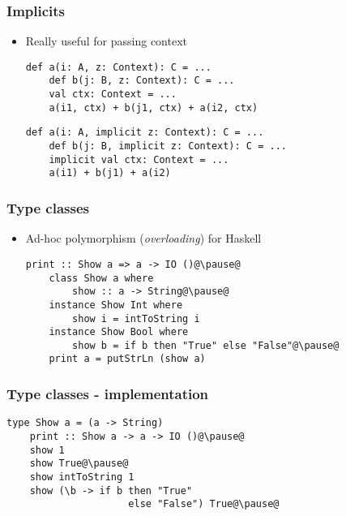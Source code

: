 \begin{frame}[fragile]
    \frametitle{Implicits}
    \begin{itemize}
        \item Really useful for passing context \\
        \begin{overprint}
        \begin{lstlisting}[mathescape]
    def a(i: A, z: Context): C = ...
    def b(j: B, z: Context): C = ...
    val ctx: Context = ...
    a(i1, ctx) + b(j1, ctx) + a(i2, ctx)
        \end{lstlisting}
        \begin{lstlisting}[mathescape]
    def a(i: A, implicit z: Context): C = ...
    def b(j: B, implicit z: Context): C = ...
    implicit val ctx: Context = ...
    a(i1) + b(j1) + a(i2)
        \end{lstlisting}
        \end{overprint}
    \end{itemize}
\end{frame}

\begin{frame}[fragile]
    \frametitle{Type classes}
    \begin{itemize}
        \pause
        \item Ad-hoc polymorphism (\emph{overloading}) for Haskell \\
        \pause
        \begin{lstlisting}[mathescape]
    print :: Show a => a -> IO ()@\pause@
    class Show a where
        show :: a -> String@\pause@
    instance Show Int where
        show i = intToString i
    instance Show Bool where
        show b = if b then "True" else "False"@\pause@
    print a = putStrLn (show a)
        \end{lstlisting}
    \end{itemize}
\end{frame}

\begin{frame}[fragile]
    \frametitle{Type classes - implementation}
        \begin{lstlisting}[mathescape]
    type Show a = (a -> String)
    print :: Show a -> a -> IO ()@\pause@
    show 1
    show True@\pause@
    show intToString 1
    show (\b -> if b then "True"
                     else "False") True@\pause@
        \end{lstlisting}
\end{frame}

